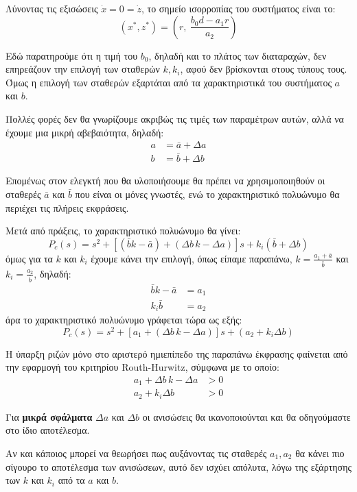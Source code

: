 \documentclass[11pt,a4paper,notitlepage,fleqn]{article}
\begin{document}
\begin{exercise}
	Λύνοντας τις εξισώσεις \( \dot x = 0 = \dot z \), το σημείο
	ισορροπίας του συστήματος είναι το:
	\[
	(x^*,z^*) = \left(r,\ \frac{b_0 d - a_1r}{a_2}
	\right)
	\]


	Εδώ παρατηρούμε ότι η τιμή του \( b_0 \), δηλαδή και το πλάτος των
	διαταραχών, δεν επηρεάζουν την επιλογή των σταθερών \( k,k_i \),
	αφού δεν βρίσκονται στους τύπους τους. Όμως η επιλογή των σταθερών
	εξαρτάται από τα χαρακτηριστικά του συστήματος \( a \) και \( b \).

	Πολλές φορές δεν θα γνωρίζουμε ακριβώς τις τιμές των παραμέτρων
	αυτών, αλλά να έχουμε μια μικρή αβεβαιότητα, δηλαδή:
	\begin{align*}
		a &= \bar a + Δa \\
		b &= \bar b + Δb
	\end{align*}

	Επομένως στον ελεγκτή που θα
	υλοποιήσουμε θα πρέπει να χρησιμοποιηθούν οι σταθερές
	\( \bar a \) και \( \bar b \) που είναι οι μόνες γνωστές, ενώ το
	χαρακτηριστικό πολυώνυμο θα περιέχει τις πλήρεις εκφράσεις.

	Μετά από πράξεις, το χαρακτηριστικό πολυώνυμο θα γίνει:
	\[
	P_c(s) = s^2 + \left[
	(\bar b k - \bar a) + (Δb\,k - Δa)
	\right]s + k_i(\bar b + Δb)
	\]
	όμως για τα \( k \) και \( k_i \) έχουμε κάνει την επιλογή,
	όπως είπαμε παραπάνω, \( k=\frac{a_1+\bar a}{\bar b} \) και
	\( k_i = \frac{a_2}{\bar b} \), δηλαδή:
	\begin{align*}
		\bar b k - \bar a &= a_1\\
		k_i \bar b &= a_2
	\end{align*}
	άρα το χαρακτηριστικό πολυώνυμο γράφεται τώρα ως εξής:
	\[
	P_c(s) = s^2 + \left[
	a_1 + (Δb\,k-Δa)
	\right]s + (a_2 + k_iΔb)
	\]

	Η ύπαρξη ριζών μόνο στο αριστερό ημιεπίπεδο της παραπάνω έκφρασης
	φαίνεται από την εφαρμογή του κριτηρίου Routh-Hurwitz, σύμφωνα
	με το οποίο:
	\begin{align*}
		a_1 + Δb\, k - Δa &> 0 \\
		a_2 + k_iΔb &>0
	\end{align*}

	Για \textbf{μικρά σφάλματα}
	\( Δa \) και \( Δb \) οι ανισώσεις θα ικανοποιούνται
	και θα οδηγούμαστε στο ίδιο αποτέλεσμα.

	Αν και κάποιος μπορεί να θεωρήσει πως αυξάνοντας τις σταθερές
	\( a_1,a_2 \) θα κάνει πιο σίγουρο το αποτέλεσμα των ανισώσεων,
	αυτό δεν ισχύει απόλυτα, λόγω της εξάρτησης των \( k \) και
	\( k_i \) από τα \( a \) και \( b \).
\end{exercise}
\end{document}
